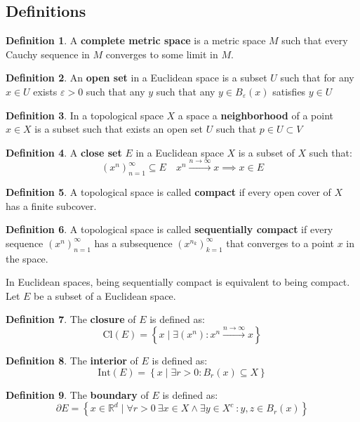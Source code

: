\documentclass[11pt,a4paper]{article}
\theoremstyle{definition}
\newtheorem{definition}{Definition}[section]
\theoremstyle{plain}
\newcommand{\R}{\mathbb{R}}
\newcommand{\set}[2]{ \left\{ #1 \mid #2 \right\} }
\begin{document}
	\subsection{Definitions}
	\begin{definition}
	A \textbf{complete metric space} is a metric space $M$ such that every
	Cauchy sequence in $M$ converges to some limit in $M$.
	\end{definition}
	\begin{definition}
	An \textbf{open set} in a Euclidean space is a subset $U$ such that
	for any $x \in U$ exists $\varepsilon > 0$ such that any $y$ such that
	any $y \in B_\varepsilon(x)$ satisfies $y \in U$
	\end{definition}
	\begin{definition}
	In a topological space $X$ a space a \textbf{neighborhood} of a point 
	$x\in X$ is a subset such that exists an open set $U$ such that 
	$p\in U\subset V$
	\end{definition}
	\begin{definition}
	A \textbf{close set} $E$ in a Euclidean space $X$ is a subset of $X$ such
	that:
	\[
		(x^n)_{n=1}^{\infty}\subseteq E \quad x^n \xrightarrow{n\to\infty} x
		\implies x \in E
	\]
	\end{definition}
	\begin{definition}
	A topological space is called \textbf{compact} if every open cover of 
	$X$ has a finite subcover.
	\end{definition}
	\begin{definition}
		A topological space is called \textbf{sequentially compact} if
		every sequence $(x^n)_{n=1}^{\infty}$ has a subsequence 
		$(x^{n_k})_{k=1}^{\infty}$ that converges to a point $x$ in the space.
	\end{definition}
	\noindent
	In Euclidean spaces, being sequentially compact is equivalent to being
	compact. Let $E$ be a subset of a Euclidean space.
	\begin{definition}
	The \textbf{closure} of $E$ is defined as:
	\[
		\mathrm{Cl}(E) = \set{x}{\exists (x^n) \colon 
    x^n \xrightarrow{n\to\infty} x}
	\]
	\end{definition}
	\begin{definition}
	The \textbf{interior} of $E$ is defined as:
	\[
		\mathrm{Int}(E) = \set{x}{\exists r > 0 \colon B_r(x) \subseteq X}
	\]
	\end{definition}
	\begin{definition}
	The \textbf{boundary} of $E$ is defined as:
	\[
		\partial E = \set{x\in\R^d}{\forall r > 0\
		\exists x \in X \land \exists y \in X^c\ : y,z\in B_r(x)}
	\]
	\end{definition}
\end{document}
